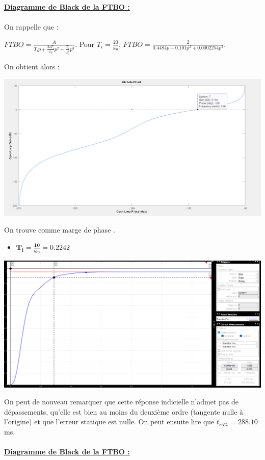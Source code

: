 \documentclass[12pt]{article}
\begin{document}
\underline{\bf Diagramme de Black de la FTBO :}
\\\\On rappelle que : 
\begin{center}
   \large $FTBO = \frac{A}{T_ip + \frac{2zT_i}{\omega_0}p^2 + \frac{T_i}{\omega_0^2}p^3}$.
    \normalsize Pour $T_i = \frac{20}{\omega_0}$, \large $FTBO = \frac{2}{0.4484p + 0.101p^2 + 0.0002254p^3}$.
\end{center}
\normalsize On obtient alors :
\begin{center}
    \includegraphics[width = 19 cm]{TP2 Simulink/Syst_2/nichols_Ti=20_sur_omega0.png}
\end{center}
On trouve comme marge de phase .
\newpage
\begin{itemize}
    \item \large $\mathbf{T_i = \frac{10}{\omega_0} = 0.2242}$
\end{itemize}
\begin{center}
    \includegraphics[width = 19 cm]{TP2 Simulink/Syst_2/tr5prct_4.2_Ti=10_sur_omega0.png}

\end{center}
On peut de nouveau remarquer que cette réponse indicielle n'admet pas de dépassements, qu'elle est bien au moins du deuxième ordre (tangente nulle à l'origine) et que l'erreur statique est nulle.
On peut ensuite lire que $t_{r5\%} = 288.10$ms.
\\\\\underline{\bf Diagramme de Black de la FTBO :}
\end{document}
